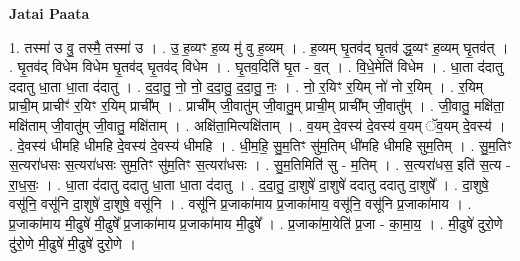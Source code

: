 \documentclass[17pt]{extarticle}
\begin{document}
\textbf{Jatai Paata} \newline

1. तस्मा॑ उ वु॒ तस्मै॒ तस्मा॑ उ । . उ॒ ह॒व्यꣳ ह॒व्य मु॑ वु ह॒व्यम् । . ह॒व्यम् घृ॒तव॑द् घृ॒तव॑ द्ध॒व्यꣳ ह॒व्यम् घृ॒तव॑त् । . घृ॒तव॑द् विधेम विधेम घृ॒तव॑द् घृ॒तव॑द् विधेम । . घृ॒तव॒दिति॑ घृ॒त - व॒त् । . वि॒धे॒मेति॑ विधेम । . धा॒ता द॑दातु ददातु धा॒ता धा॒ता द॑दातु । . द॒दा॒तु॒ नो॒ नो॒ द॒दा॒तु॒ द॒दा॒तु॒ नः॒ । . नो॒ र॒यिꣳ र॒यिम् नो॑ नो र॒यिम् । . र॒यिम् प्राची॒म् प्राचीꣳ॑ र॒यिꣳ र॒यिम् प्राची᳚म् । . प्राची᳚म् जी॒वातु॑म् जी॒वातु॒म् प्राची॒म् प्राची᳚म् जी॒वातु᳚म् । . जी॒वातु॒ मक्षि॑ता॒ मक्षि॑ताम् जी॒वातु॑म् जी॒वातु॒ मक्षि॑ताम् । . अक्षि॑ता॒मित्यक्षि॑ताम् । . व॒यम् दे॒वस्य॑ दे॒वस्य॑ व॒यम् ॅव॒यम् दे॒वस्य॑ । . दे॒वस्य॑ धीमहि धीमहि दे॒वस्य॑ दे॒वस्य॑ धीमहि । . धी॒म॒हि॒ सु॒म॒तिꣳ सु॑म॒तिम् धी॑महि धीमहि सुम॒तिम् । . सु॒म॒तिꣳ स॒त्यरा॑धसः स॒त्यरा॑धसः सुम॒तिꣳ सु॑म॒तिꣳ स॒त्यरा॑धसः । . सु॒म॒तिमिति॑ सु - म॒तिम् । . स॒त्यरा॑धस॒ इति॑ स॒त्य - रा॒ध॒सः॒ । . धा॒ता द॑दातु ददातु धा॒ता धा॒ता द॑दातु । . द॒दा॒तु॒ दा॒शुषे॑ दा॒शुषे॑ ददातु ददातु दा॒शुषे᳚ । . दा॒शुषे॒ वसू॑नि॒ वसू॑नि दा॒शुषे॑ दा॒शुषे॒ वसू॑नि । . वसू॑नि प्र॒जाका॑माय प्र॒जाका॑माय॒ वसू॑नि॒ वसू॑नि प्र॒जाका॑माय । . प्र॒जाका॑माय मी॒ढुषे॑ मी॒ढुषे᳚ प्र॒जाका॑माय प्र॒जाका॑माय मी॒ढुषे᳚ । . प्र॒जाका॑मा॒येति॑ प्र॒जा - का॒मा॒य॒ । . मी॒ढुषे॑ दुरो॒णे दु॑रो॒णे मी॒ढुषे॑ मी॒ढुषे॑ दुरो॒णे । \newline
\end{document}
